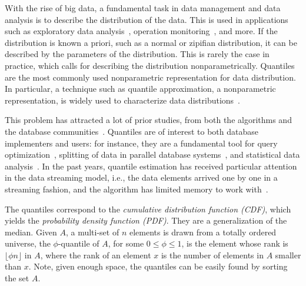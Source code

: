 With the rise of big data, a fundamental task in data management and data analysis is to describe the distribution of the data. This is used in applications such as exploratory data analysis~\cite{vartak2015seedb}, operation monitoring~\cite{abraham2013scuba}, and more. If the distribution is known a priori, such as a normal or zipifian distribution, it can be described by the parameters of the distribution. This is rarely the case in practice, which calls for describing the distribution nonparametrically. Quantiles are the most commonly used nonparametric representation for data distribution. In particular, a technique such as quantile approximation, a nonparametric representation, is widely used to characterize data distributions~\cite{WangLuoYiCormode2013, Zhao2021KLLPlus}.


This problem has attracted a lot of prior studies, from both the algorithms and the database communities~\cite{MunroPeterson1980, MankuRajagoplanLindsay1998, HungTing2010Omega, mergeables_summaries, DataSketches}. Quantiles are of interest to both database implementers and users: for instance, they are a fundamental tool for query optimization~\cite{MankuRajagoplanLindsay1998}, splitting of data in parallel database systems~\cite{PoosalaIoannidis1996EstimationOfQueryDistiributionAndAppInParallel, Cormode_2011_disributed_monitoring, Heule_2013_cardinality_est}, and statistical data analysis~\cite{Indyk2004GeometricProblems, Cranor2003Gigascope}. In the past years, quantile estimation has received particular attention in the data streaming model, i.e., the data elements arrived one by one in a streaming fashion, and the algorithm has limited memory to work with~\cite{MunroPeterson1980, MankuRajagoplanLindsay1998, MankuRajagoplanLindsay1999, Greenwald2001_online_computation, Gilbert2002SummarizeUniverse, Shrivastava2004Qdigest, Cormode2005CountMinSketch, HungTing2010Omega, mergeables_summaries, KarninKevinLiberty2016, Zhao2021KLLPlus}. 


The quantiles correspond to the \emph{cumulative distribution function (CDF)}, which yields the \emph{probability density function (PDF)}. They are a generalization of the median. Given $A$, a multi-set of $n$ elements is drawn from a totally ordered universe, the $\phi$-quantile of $A$, for some  $0 \leq \phi \leq 1$, is the element whose rank is $\lfloor \phi n \rfloor $ in $A$, where the rank of an element $x$ is the number of elements in $A$ smaller than $x$. Note, given enough space, the quantiles can be easily found by sorting the set $A$.


